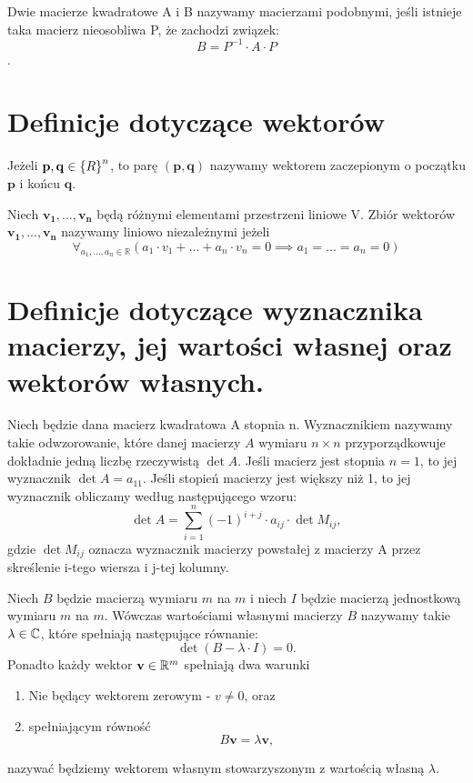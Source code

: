 \documentclass[10pt,a4paper]{report}
\newcommand{\vr}[1]{\mathbf{#1}}
\newcommand{\mx}[1]{{#1}}
\begin{document}
\begin{definition}
Dwie macierze kwadratowe A i B nazywamy macierzami podobnymi, jeśli istnieje taka macierz nieosobliwa P, że zachodzi związek: 
$$
B=P^{-1}\cdot A\cdot P
$$.
\end{definition}


\section{Definicje dotyczące wektorów} 

\begin{definition}
Jeżeli $\vr{p},\vr{q}\in \set{R}^{n}$, to parę $(\vr{p},\vr{q})$ nazywamy wektorem zaczepionym o początku $\vr{p}$ i końcu $\vr{q}$.
\end{definition}

\begin{definition}
Niech $\vr{v_{1}},..., \vr{v_{n}}$ będą różnymi elementami przestrzeni liniowe V. Zbiór wektorów ${\vr{v_{1}},...,\vr{v_{n}}}$ nazywamy liniowo niezależnymi jeżeli 
$$
\forall_{a_{1},...,a_{n}\in \mathbb{R}} (a_{1}\cdot v_{1} + ... + a_{n}\cdot v_{n} = 0 \implies a_{1}=...=a_{n}=0)
$$ 
\end{definition}

\section{Definicje dotyczące wyznacznika macierzy, jej wartości własnej oraz wektorów własnych.}

\begin{definition}[??]
Niech będzie dana macierz kwadratowa A stopnia n. Wyznacznikiem nazywamy takie odwzorowanie, które danej macierzy $A$ wymiaru $n \times n$ przyporządkowuje dokładnie jedną liczbę rzeczywistą $\det A$. Jeśli macierz jest stopnia $n = 1$, to jej wyznacznik $\det A  = a_{11}$. 
Jeśli stopień macierzy jest większy niż 1, to jej wyznacznik obliczamy według następującego wzoru: 
$$
\det A = \sum_{i=1}^{n} (-1)^{i+j}\cdot a_{ij}\cdot \det M_{ij},
$$
gdzie $\det M_{ij}$ oznacza wyznacznik macierzy powstałej z macierzy A przez skreślenie i-tego wiersza i j-tej kolumny.
\end{definition}

\begin{definition}
Niech $\mx{B}$ będzie macierzą wymiaru $m$ na $m$ i niech $I$ będzie macierzą jednostkową wymiaru $m$ na $m$. Wówczas wartościami własnymi macierzy $B$ nazywamy takie $\lambda \in \mathbb{C}$, które spełniają następujące równanie:
$$
\det (\mx{B}-\lambda\cdot \mx{I})=0. 
$$ 
Ponadto każdy wektor $\vr{v} \in \setR^m$ spełniają dwa warunki
\begin{enumerate}
\item Nie będący wektorem zerowym - $v \neq 0$, oraz
\item spełniającym równość
$$
\mx{B} \vr{v} = \lambda \vr{v},
$$
\end{enumerate}
nazywać będziemy wektorem własnym stowarzyszonym z wartością własną $\lambda$.
\end{definition}
\end{document}

